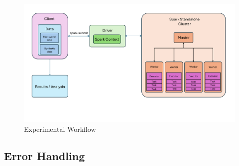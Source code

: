 \begin{figure}[ht]
    \centering
    \includegraphics[width=\linewidth]{images/Workflow_image.pdf}
    \caption{Experimental Workflow}
    \label{fig:workflow}
\end{figure}

\subsection{Error Handling}

